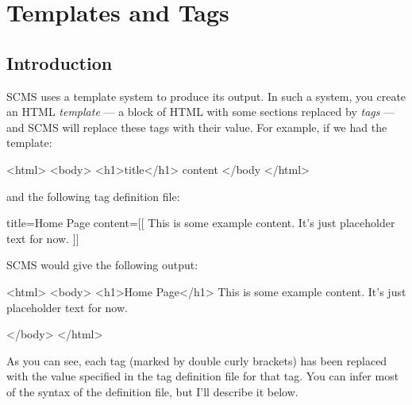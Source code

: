 %
%
%
%
%
%
% 
%
% 
% 
%

\chapter{Templates and Tags}
\label{templatesandtags}
\section{Introduction}
SCMS uses a template system to produce its output. In such a system,
you create an HTML \emph{template} --- a block of HTML with some sections replaced
by \emph{tags} --- and SCMS will replace these tags with their value.
For example, if we had the template:
\begin{MyVerbatim}
<html>
<body>
    <h1>{{title}}</h1>
    {{content}}
</body
</html>
\end{MyVerbatim}
and the following tag definition file:
\begin{MyVerbatim}
title=Home Page
content=[[
This is some example content. It's just placeholder text
for now.
]]
\end{MyVerbatim}
SCMS would give the following output:
\begin{MyVerbatim}
<html>
<body>
    <h1>Home Page</h1>
	This is some example content. It's just placeholder text
for now.

</body>
</html> 
\end{MyVerbatim}
As you can see, each tag (marked by double curly brackets) has been replaced
with the value specified in the tag definition file for that tag. You can
infer most of the syntax of the definition file, but I'll describe it below.

